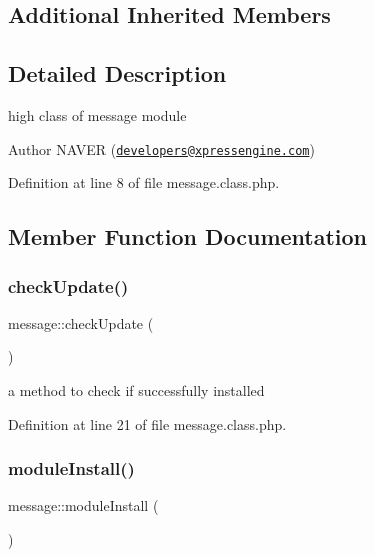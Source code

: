 \subsection*{Additional Inherited Members}


\subsection{Detailed Description}
high class of message module 

\begin{DoxyAuthor}{Author}
N\+A\+V\+ER (\href{mailto:developers@xpressengine.com}{\tt developers@xpressengine.\+com}) 
\end{DoxyAuthor}


Definition at line 8 of file message.\+class.\+php.



\subsection{Member Function Documentation}
\hypertarget{classmessage_a682929b12e71f071a533e16e4f262cc1}{}\label{classmessage_a682929b12e71f071a533e16e4f262cc1} 
\subsubsection{\texorpdfstring{check\+Update()}{checkUpdate()}}
{\footnotesize\ttfamily message\+::check\+Update (\begin{DoxyParamCaption}{ }\end{DoxyParamCaption})}



a method to check if successfully installed 



Definition at line 21 of file message.\+class.\+php.

\hypertarget{classmessage_a649a72a242c308a98be4fb5e990b3212}{}\label{classmessage_a649a72a242c308a98be4fb5e990b3212} 
\subsubsection{\texorpdfstring{module\+Install()}{moduleInstall()}}
{\footnotesize\ttfamily message\+::module\+Install (\begin{DoxyParamCaption}{ }\end{DoxyParamCaption})}



